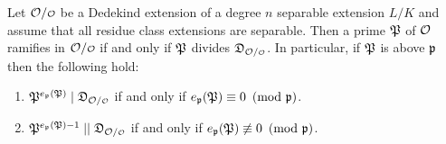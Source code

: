     \begin{theorem}\label{thm:ramifies_if_and_only_if_divides_the_different}
      Let $\mc{O}/\smc{O}$ be a Dedekind extension of a degree $n$ separable extension $L/K$ and assume that all residue class extensions are separable. Then a prime $\mathfrak{P}$ of $\mathcal{O}$ ramifies in $\mc{O}/\smc{O}$ if and only if $\mathfrak{P}$ divides $\mf{D}_{\mc{O}/\smc{O}}$. In particular, if $\mathfrak{P}$ is above $\mathfrak{p}$ then the following hold:
      \begin{enumerate}[label=(\roman*)]
        \item $\mf{P}^{e_{\mf{p}}(\mf{P})} \mid \mf{D}_{\mc{O}/\smc{O}}$ if and only if $e_{\mathfrak{p}}(\mathfrak{P}) \equiv 0 \ \left(\text{mod }\mathfrak{p}\right)$.
        \item $\mf{P}^{e_{\mf{p}}(\mf{P})-1} \mid\mid \mf{D}_{\mc{O}/\smc{O}}$ if and only if $e_{\mathfrak{p}}(\mathfrak{P}) \not\equiv 0 \ \left(\text{mod }\mathfrak{p}\right)$.
      \end{enumerate}
    \end{theorem}
